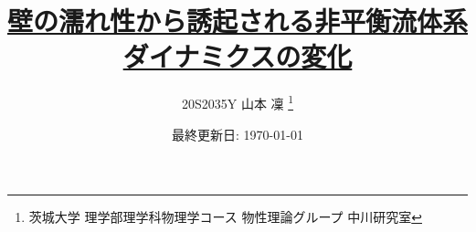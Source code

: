 \documentclass[dvipdfmx]{jsreport}
\begin{document}
\title{\href{https://github.com/m-agnet/Report.git}{壁の濡れ性から誘起される非平衡流体系ダイナミクスの変化}}
\author{20S2035Y 山本 凜 \thanks{茨城大学 理学部理学科物理学コース 物性理論グループ 中川研究室}}
\date{最終更新日: \today}
\maketitle
\newpage

\setcounter{tocdepth}{3}
\tableofcontents
\newpage








\appendix





\end{document}
